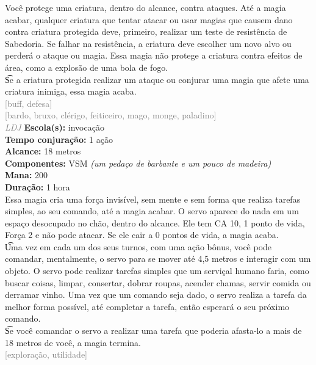 \documentclass{RPG_Adventure}[2021/10/20]
\begin{document}
{\normalsize Você protege uma criatura, dentro do alcance, contra ataques. Até a magia acabar, qualquer criatura que tentar atacar ou usar magias que causem dano contra criatura protegida deve, primeiro, realizar um teste de resistência de Sabedoria. Se falhar na resistência, a criatura deve escolher um novo alvo ou perderá o ataque ou magia. Essa magia não protege a criatura contra efeitos de área, como a explosão de uma bola de fogo.\\\t Se a criatura protegida realizar um ataque ou conjurar uma magia que afete uma criatura inimiga, essa magia acaba.\\}
{\scriptsize \textcolor{gray}{[buff, defesa]\\}}
{\scriptsize \textcolor{gray}{[bardo, bruxo, clérigo, feiticeiro, mago, monge, paladino]\\}}
{\tiny \textcolor{gray}{\textit{LDJ}}}
{\small \t \textbf{Escola(s):} invocação\\\t \textbf{Tempo conjuração:} 1 ação\\\t \textbf{Alcance:} 18 metros\\\t \textbf{Componentes:} VSM \textit{(um pedaço de barbante e um pouco de madeira)}\\\t \textbf{Mana:} 200\\\t \textbf{Duração:} 1 hora\\}
{\normalsize Essa magia cria uma força invisível, sem mente e sem forma que realiza tarefas simples, ao seu comando, até a magia acabar. O servo aparece do nada em um espaço desocupado no chão, dentro do alcance. Ele tem CA 10, 1 ponto de vida, Força 2 e não pode atacar. Se ele cair a 0 pontos de vida, a magia acaba.\\\t Uma vez em cada um dos seus turnos, com uma ação bônus, você pode comandar, mentalmente, o servo para se mover até 4,5 metros e interagir com um objeto. O servo pode realizar tarefas simples que um serviçal humano faria, como buscar coisas, limpar, consertar, dobrar roupas, acender chamas, servir comida ou derramar vinho. Uma vez que um comando seja dado, o servo realiza a tarefa da melhor forma possível, até completar a tarefa, então esperará o seu próximo comando.\\\t Se você comandar o servo a realizar uma tarefa que poderia afasta-lo a mais de 18 metros de você, a magia termina.\\}
{\scriptsize \textcolor{gray}{[exploração, utilidade]\\}}
\end{document}
